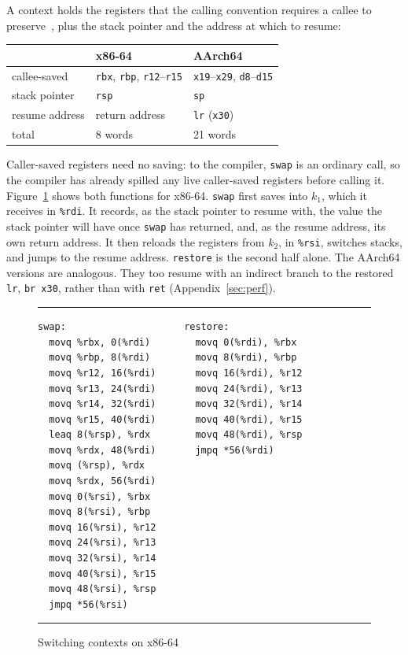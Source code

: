 \documentclass[sigplan,nonacm]{acmart}
\begin{document}
A context holds the registers that the calling convention requires a
callee to preserve~\cite{sysvabi,aapcs64}, plus the stack pointer and
the address at which to resume:
%
\begin{center}
\small
\begin{tabular}{@{}lll@{}}
\toprule
 & x86-64 & AArch64 \\
\midrule
callee-saved & \texttt{rbx}, \texttt{rbp}, \texttt{r12}--\texttt{r15} & \texttt{x19}--\texttt{x29}, \texttt{d8}--\texttt{d15} \\
stack pointer & \texttt{rsp} & \texttt{sp} \\
resume address & return address & \texttt{lr} (\texttt{x30}) \\
total & 8 words & 21 words \\
\bottomrule
\end{tabular}
\end{center}
%
Caller-saved registers need no saving: to the compiler,
\lstinline|swap| is an ordinary call, so the compiler has already
spilled any live caller-saved registers before calling it.
%
Figure~\ref{fig:x64} shows both functions for x86-64.
%
\lstinline|swap| first saves into $k_1$, which it receives in
\texttt{\%rdi}.
%
It records, as the stack pointer to resume with, the value the stack
pointer will have once \lstinline|swap| has returned, and, as the
resume address, its own return address.
%
It then reloads the registers from $k_2$, in \texttt{\%rsi}, switches
stacks, and jumps to the resume address.
%
\lstinline|restore| is the second half alone.
%
The AArch64 versions are analogous.
%
They too resume with an indirect branch to the restored
\lstinline|lr|, \lstinline|br x30|, rather than with
\lstinline|ret| (Appendix~\ref{sec:perf}).

\begin{figure}
\hrule
\begin{lstlisting}[language={},mathescape=false]
swap:                     restore:
  movq %rbx, 0(%rdi)        movq 0(%rdi), %rbx
  movq %rbp, 8(%rdi)        movq 8(%rdi), %rbp
  movq %r12, 16(%rdi)       movq 16(%rdi), %r12
  movq %r13, 24(%rdi)       movq 24(%rdi), %r13
  movq %r14, 32(%rdi)       movq 32(%rdi), %r14
  movq %r15, 40(%rdi)       movq 40(%rdi), %r15
  leaq 8(%rsp), %rdx        movq 48(%rdi), %rsp
  movq %rdx, 48(%rdi)       jmpq *56(%rdi)
  movq (%rsp), %rdx
  movq %rdx, 56(%rdi)
  movq 0(%rsi), %rbx
  movq 8(%rsi), %rbp
  movq 16(%rsi), %r12
  movq 24(%rsi), %r13
  movq 32(%rsi), %r14
  movq 40(%rsi), %r15
  movq 48(%rsi), %rsp
  jmpq *56(%rsi)
\end{lstlisting}
\hrule
\caption{Switching contexts on x86-64}
\label{fig:x64}
\end{figure}
\end{document}
